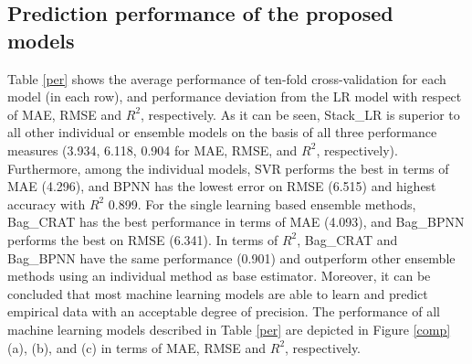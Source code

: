 \documentclass[11pt]{article}
\begin{document}
	\subsection{Prediction performance of the proposed models}
	Table \ref{per} shows the average performance of ten-fold cross-validation for each model (in each row), and performance deviation from the LR model with respect of MAE, RMSE and $R^2$, respectively. As it can be seen, Stack\_LR is superior to all other individual or ensemble models on the basis of all three performance measures (3.934, 6.118, 0.904 for MAE, RMSE, and $R^2$, respectively). Furthermore, among the individual models, SVR performs the best in terms of MAE (4.296), and BPNN has the lowest error on RMSE (6.515) and highest accuracy with $R^2$ 0.899. For the single learning based ensemble methods, Bag\_CRAT has the best performance in terms of MAE (4.093), and Bag\_BPNN performs the best on RMSE (6.341). In terms of $R^2$, Bag\_CRAT and Bag\_BPNN have the same performance (0.901) and outperform other ensemble methods using an individual method as base estimator. Moreover, it can be concluded that most machine learning models are able to learn and predict empirical data with an acceptable degree of precision. The performance of all machine learning models described in Table \ref{per} are depicted in Figure \ref{comp} (a), (b), and (c) in terms of MAE, RMSE and $R^2$, respectively.
	
\end{document}
